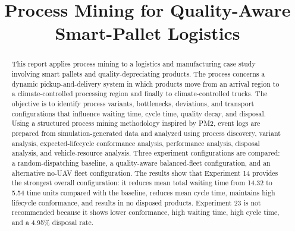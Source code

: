 \documentclass[conference]{IEEEtran}
\begin{document}
\title{Process Mining for Quality-Aware Smart-Pallet Logistics}

\author{
\and
{}
\and
{}
}

\maketitle

\begin{abstract}
This report applies process mining to a logistics and manufacturing case study involving smart pallets and quality-depreciating products. The process concerns a dynamic pickup-and-delivery system in which products move from an arrival region to a climate-controlled processing region and finally to climate-controlled trucks. The objective is to identify process variants, bottlenecks, deviations, and transport configurations that influence waiting time, cycle time, quality decay, and disposal. Using a structured process mining methodology inspired by PM2, event logs are prepared from simulation-generated data and analyzed using process discovery, variant analysis, expected-lifecycle conformance analysis, performance analysis, disposal analysis, and vehicle-resource analysis. Three experiment configurations are compared: a random-dispatching baseline, a quality-aware balanced-fleet configuration, and an alternative no-UAV fleet configuration. The results show that Experiment 14 provides the strongest overall configuration: it reduces mean total waiting time from 14.32 to 5.54 time units compared with the baseline, reduces mean cycle time, maintains high lifecycle conformance, and results in no disposed products. Experiment 23 is not recommended because it shows lower conformance, high waiting time, high cycle time, and a 4.95\% disposal rate.
\end{abstract}
\end{document}
